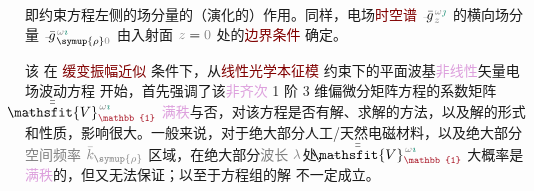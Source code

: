 即约束方程左侧的场分量的（演化的）作用。同样，电场\textcolor{Maroon}{时空谱} $\Xint{{}^{}_{\mathcolor{gray}{-}}}{10}{\bar{g}}^{\;\!\mathcolor{gray}{\omega} \textcolor{PineGreen}{\jmath}}_{\;\! \mathcolor{gray}{z}}$ 的横向场分量 $\Xint{{}^{}_{\mathcolor{gray}{-}}}{10}{\bar{g}}^{\;\!\mathcolor{gray}{\omega} \textcolor{PineGreen}{\imath}}_{\;\! \symup{\rho} \mathcolor{gray}{0}}$ 由入射面 $\mathcolor{gray}{z \mathcolor{black}{=} 0}$ 处的\textcolor{Maroon}{边界条件}  确定。

该  在 \textcolor{Maroon}{缓变振幅近似} 条件下，从\textcolor{Maroon}{线性光学本征模}  约束下的\textcolor{PineGreen}{平面波基}\textcolor{Plum}{非线性}矢量电场波动方程  开始，首先强调了该\textcolor{Plum}{非齐次} 1 阶 3 维偏微分矩阵方程的系数矩阵 $\Xint{\mathcolor{gray}{-}}{25}{\bar{\bar{\mathsfit{V}}}}^{\;\! \mathcolor{gray}{\omega} \textcolor{PineGreen}{\imath}}_{\textcolor{Maroon}{\mathbb{1}}}$ \textcolor{Plum}{满秩}与否，对该方程是否有解、求解的方法，以及解的形式和性质，影响很大。一般来说，对于绝大部分人工/天然电磁材料，以及绝大部分\textcolor{gray}{空间频率} $\mathcolor{gray}{\bar{k}_{\symup{\rho}}}$ 区域，在绝大部分\textcolor{gray}{波长} $\mathcolor{gray}{\lambda}$处，$\Xint{\mathcolor{gray}{-}}{25}{\bar{\bar{\mathsfit{V}}}}^{\;\! \mathcolor{gray}{\omega} \textcolor{PineGreen}{\imath}}_{\textcolor{Maroon}{\mathbb{1}}}$ 大概率是\textcolor{Plum}{满秩}的，但又无法保证；以至于方程组的解  不一定成立。

